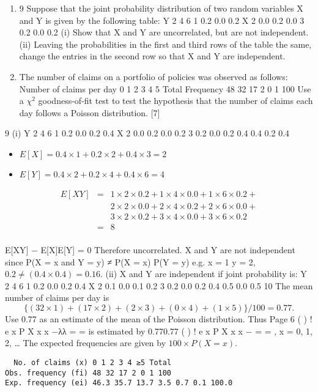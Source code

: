\documentclass[a4paper,12pt]{article}
\begin{document}
\begin{enumerate}
\item
9 Suppose that the joint probability distribution of two random variables X and Y is
given by the following table:
Y
2 4 6
1 0.2 0.0 0.2
X 2 0.0 0.2 0.0
3 0.2 0.0 0.2
(i) Show that X and Y are uncorrelated, but are not independent. 
(ii) Leaving the probabilities in the first and third rows of the table the same,
change the entries in the second row so that X and Y are independent. 
\item  The number of claims on a portfolio of policies was observed as follows:
Number of claims per day 0 1 2 3 4 5 Total
Frequency 48 32 17 2 0 1 100
Use a $\chi^2$ goodness-of-fit test to test the hypothesis that the number of claims each day
follows a Poisson distribution. [7]

\end{enumerate}
9 (i)
Y
2 4 6
1 0.2 0.0 0.2 0.4
X 2 0.0 0.2 0.0 0.2
3 0.2 0.0 0.2 0.4
0.4 0.2 0.4
\begin{itemize}
    \item $E[X] = 0.4 \times 1 + 0.2 \times 2 + 0.4 \times 3 = 2$
\item $E[Y] = 0.4 \times 2 + 0.2 \times 4 + 0.4 \times 6 = 4$
\end{itemize}
\begin{eqnarray*}
E[XY] &=& 1 \times 2 \times 0.2 + 1 \times 4 \times 0.0 + 1 \times 6 \times 0.2
+ \\ & & 2 \times 2 \times 0.0 + 2 \times 4 \times 0.2 + 2 \times 6 \times 0.0
+ \\ & &  3 \times 2 \times 0.2 + 3 \times 4 \times 0.0 + 3 \times 6 \times 0.2 \\
&=&  8\\
\end{eqnarray*}

E[XY] − E[X]E[Y] = 0 Therefore uncorrelated.
X and Y are not independent since
P(X = x and Y = y) ≠ P(X = x) P(Y = y)
e.g. x = 1 y = 2, $0.2 \neq (0.4 \times 0.4) = 0.16$.
(ii) X and Y are independent if joint probability is:
Y
2 4 6
1 0.2 0.0 0.2 0.4
X 2 0.1 0.0 0.1 0.2
3 0.2 0.0 0.2 0.4
0.5 0.0 0.5
10 The mean number of claims per day is
\[\{(32 \times 1) + (17 \times 2) + (2 \times 3) + (0 \times 4) + (1 \times 5)\}/100 = 0.77.\]
Use 0.77 as an estimate of the mean of the Poisson distribution. Thus
Page 6
( )
!
e x P X x
x
−λλ
= = is estimated by
0.770.77 ( )
!
e x P X x
x
−
= = , x = 0, 1, 2, …
The expected frequencies are given by $100 \times P(X = x)$.
\begin{verbatim}
  No. of claims (x) 0 1 2 3 4 ≥5 Total
Obs. frequency (fi) 48 32 17 2 0 1 100
Exp. frequency (ei) 46.3 35.7 13.7 3.5 0.7 0.1 100.0  
\end{verbatim}
\end{document}
